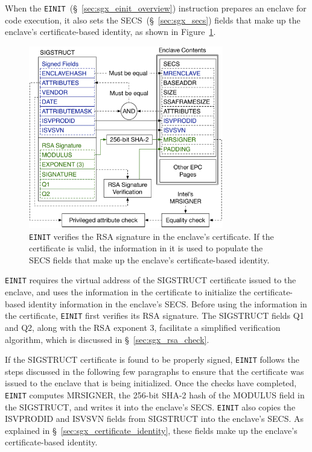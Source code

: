 \label{sec:sgx_einit_sigstruct}

When the \texttt{EINIT}~(\S~\ref{sec:sgx_einit_overview}) instruction prepares
an enclave for code execution, it also sets the SECS~(\S~\ref{sec:sgx_secs})
fields that make up the enclave's certificate-based identity, as shown in
Figure~\ref{fig:sgx_einit_sigstruct}.

\begin{figure}[hbt]
  \centering
  \includegraphics[width=85mm]{figures/sgx_einit_sigstruct.pdf}
  \caption{
    \texttt{EINIT} verifies the RSA signature in the enclave's certificate. If
    the certificate is valid, the information in it is used to populate the
    SECS fields that make up the enclave's certificate-based identity.
  }
  \label{fig:sgx_einit_sigstruct}
\end{figure}


\texttt{EINIT} requires the virtual address of the SIGSTRUCT certificate
issued to the enclave, and uses the information in the certificate to
initialize the certificate-based identity information in the enclave's SECS.
Before using the information in the certificate, \texttt{EINIT} first verifies
its RSA signature. The SIGSTRUCT fields Q1 and Q2, along with the RSA exponent
3, facilitate a simplified verification algorithm, which is discussed in
\S~\ref{sec:sgx_rsa_check}.

If the SIGSTRUCT certificate is found to be properly signed, \texttt{EINIT}
follows the steps discussed in the following few paragraphs to ensure that the
certificate was issued to the enclave that is being initialized. Once the
checks have completed, \texttt{EINIT} computes MRSIGNER, the 256-bit SHA-2 hash
of the MODULUS field in the SIGSTRUCT, and writes it into the enclave's SECS.
\texttt{EINIT} also copies the ISVPRODID and ISVSVN fields from SIGSTRUCT into
the enclave's SECS. As explained in \S~\ref{sec:sgx_certificate_identity},
these fields make up the enclave's certificate-based identity.


